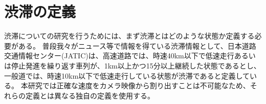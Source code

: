 \section{渋滞の定義}
渋滞についての研究を行うためには、まず渋滞とはどのような状態か定義する必要がある。
普段我々がニュース等で情報を得ている渋滞情報として、日本道路交通情報センター(JATIC)は、高速道路では、時速40km以下で低速走行あるいは停止発進を繰り返す車列が、1km以上かつ15分以上継続した状態であるとし、一般道では、時速10km以下で低速走行している状態が渋滞であると定義している。
本研究では正確な速度をカメラ映像から割り出すことは不可能なため、それらの定義とは異なる独自の定義を使用する。







